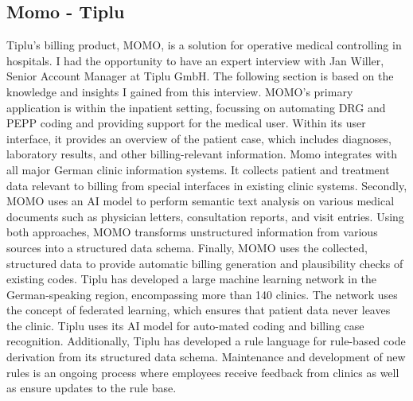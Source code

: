 \subsection{Momo - Tiplu}\label{subsec:momo---tiplu}
Tiplu’s billing product, MOMO, is a solution for operative medical controlling in hospitals.
I had the opportunity to have an expert interview with Jan Willer, Senior Account Manager at Tiplu GmbH. The following section is based on the knowledge and insights I gained from this interview. MOMO’s primary application is within the inpatient
setting, focussing on automating DRG and PEPP coding and providing support for
the medical user.
Within its user interface, it provides an overview of the patient case, which includes diagnoses, laboratory results, and other billing-relevant information.
Momo integrates with all major German clinic information systems.
It collects patient and treatment data relevant to billing from special interfaces in existing clinic systems.
Secondly, MOMO uses an AI model to perform semantic text analysis on various
medical documents such as physician letters, consultation reports, and visit entries.
Using both approaches, MOMO transforms unstructured information from various
sources into a structured data schema.
Finally, MOMO uses the collected, structured data to provide automatic billing generation and plausibility checks of existing codes.
Tiplu has developed a large machine learning network in the German-speaking region,
encompassing more than 140 clinics.
The network uses the concept of federated learning, which ensures that patient data never leaves the clinic.
Tiplu uses its AI model for auto-mated coding and billing case recognition.
Additionally, Tiplu has developed a rule language for rule-based code derivation from its structured data schema. Maintenance
and development of new rules is an ongoing process where employees receive feedback
from clinics as well as ensure updates to the rule base.
